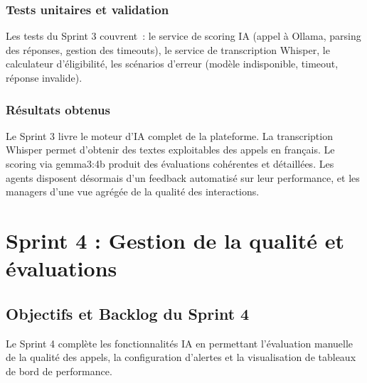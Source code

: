 \subsubsection{Tests unitaires et validation}

Les tests du Sprint 3 couvrent~: le service de scoring IA (appel à Ollama, parsing des
réponses, gestion des timeouts), le service de transcription Whisper, le calculateur
d'éligibilité, les scénarios d'erreur (modèle indisponible, timeout, réponse invalide).

\subsubsection{Résultats obtenus}

Le Sprint 3 livre le moteur d'IA complet de la plateforme. La transcription Whisper permet
d'obtenir des textes exploitables des appels en français. Le scoring via gemma3:4b produit
des évaluations cohérentes et détaillées. Les agents disposent désormais d'un feedback
automatisé sur leur performance, et les managers d'une vue agrégée de la qualité des
interactions.

\section[Sprint 4 : Qualité]{Sprint 4 : Gestion de la qualité et évaluations}
\label{sec:sprint4}

\subsection{Objectifs et Backlog du Sprint 4}
\label{subsec:sprint4_backlog}

Le Sprint 4 complète les fonctionnalités IA en permettant l'évaluation manuelle de la qualité
des appels, la configuration d'alertes et la visualisation de tableaux de bord de performance.

